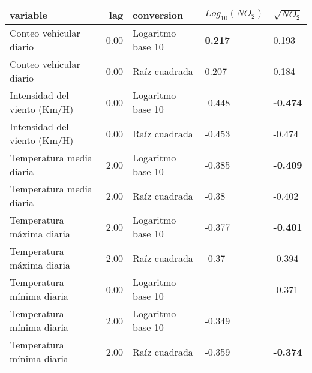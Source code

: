\begin{table}[ht]
\centering
\begin{tabular}{lrlll}
  \hline
variable & lag & conversion & $Log_{10}(NO_{2})$ & $\sqrt{NO_{2}}$ \\ 
  \hline
Conteo vehicular diario & 0.00 & Logaritmo base 10 & \textbf{0.217} & 0.193 \\ 
  Conteo vehicular diario & 0.00 & Raíz cuadrada & 0.207 & 0.184 \\ 
  Intensidad del viento (Km/H) & 0.00 & Logaritmo base 10 & -0.448 & \textbf{-0.474} \\ 
  Intensidad del viento (Km/H) & 0.00 & Raíz cuadrada & -0.453 & -0.474 \\ 
  Temperatura media diaria & 2.00 & Logaritmo base 10 & -0.385 & \textbf{-0.409} \\ 
  Temperatura media diaria & 2.00 & Raíz cuadrada & -0.38 & -0.402 \\ 
  Temperatura máxima diaria & 2.00 & Logaritmo base 10 & -0.377 & \textbf{-0.401} \\ 
  Temperatura máxima diaria & 2.00 & Raíz cuadrada & -0.37 & -0.394 \\ 
  Temperatura mínima diaria & 0.00 & Logaritmo base 10 &  & -0.371 \\ 
  Temperatura mínima diaria & 2.00 & Logaritmo base 10 & -0.349 &  \\ 
  Temperatura mínima diaria & 2.00 & Raíz cuadrada & -0.359 & \textbf{-0.374} \\ 
   \hline
\end{tabular}
\end{table}
